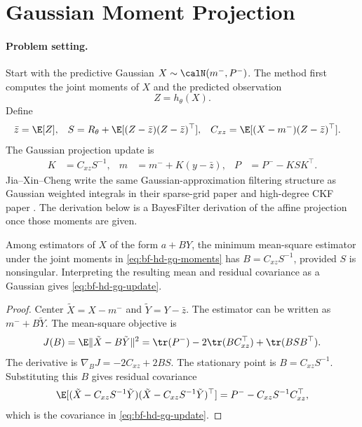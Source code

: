 \section{Gaussian Moment Projection}
\label{sec:bf-hd-moment-projection}

\paragraph{Problem setting.}
Start with the predictive Gaussian \(X\sim\calN(m^-,P^-)\).  The method first
computes the joint moments of \(X\) and the predicted observation
\[
  Z=h_\theta(X).
\]
Define
\begin{align}
  \bar z &= \E[Z],&
  S &= R_\theta+\E[(Z-\bar z)(Z-\bar z)^\top],&
  C_{xz}&=\E[(X-m^-)(Z-\bar z)^\top].
  \label{eq:bf-hd-gq-moments}
\end{align}
The Gaussian projection update is
\begin{align}
  K &= C_{xz}S^{-1},&
  m &= m^-+K(y-\bar z),&
  P &= P^- - KSK^\top .
  \label{eq:bf-hd-gq-update}
\end{align}
Jia--Xin--Cheng write the same Gaussian-approximation filtering structure as
Gaussian weighted integrals in their sparse-grid paper and high-degree CKF
paper \citep{jia2012sparsegrid,jia2013highdegree}.  The derivation below is a
BayesFilter derivation of the affine projection once those moments are given.

\begin{proposition}
\label{prop:bf-hd-affine-projection}
Among estimators of \(X\) of the form \(a+BY\), the minimum mean-square
estimator under the joint moments in \eqref{eq:bf-hd-gq-moments} has
\(B=C_{xz}S^{-1}\), provided \(S\) is nonsingular.  Interpreting the resulting
mean and residual covariance as a Gaussian gives \eqref{eq:bf-hd-gq-update}.
\end{proposition}

\begin{proof}
Center \(\tilde X=X-m^-\) and \(\tilde Y=Y-\bar z\).  The estimator can be
written as \(m^-+B\tilde Y\).  The mean-square objective is
\[
  J(B)=\E\|\tilde X-B\tilde Y\|^2
  =\tr(P^-)-2\tr(BC_{xz}^\top)+\tr(BSB^\top).
\]
The derivative is \(\nabla_BJ=-2C_{xz}+2BS\).  The stationary point is
\(B=C_{xz}S^{-1}\).  Substituting this \(B\) gives residual covariance
\[
  \E[(\tilde X-C_{xz}S^{-1}\tilde Y)
     (\tilde X-C_{xz}S^{-1}\tilde Y)^\top]
  =P^- - C_{xz}S^{-1}C_{xz}^\top ,
\]
which is the covariance in \eqref{eq:bf-hd-gq-update}.
\end{proof}


